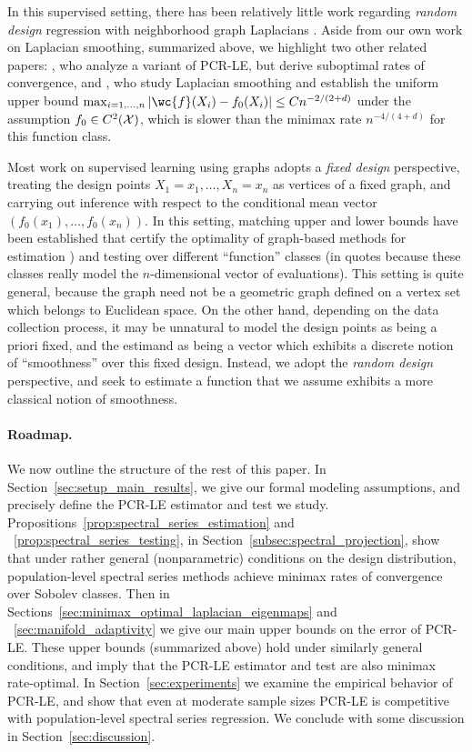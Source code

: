 In this supervised setting, there has been relatively little work regarding \emph{random design} regression with neighborhood graph Laplacians . Aside from our own work on Laplacian smoothing, summarized above, we highlight two other related papers: \citet{lee2016}, who analyze a variant of PCR-LE, but derive suboptimal rates of convergence, and \citet{trillos2020}, who study Laplacian smoothing and establish the uniform upper bound $\max_{i = 1,\ldots,n}|\wc{f}(X_i) - f_0(X_i)| \leq C n^{-2/(2 + d)}$ under the assumption $f_0 \in C^2(\mathcal{X})$, which is slower than the minimax rate $n^{-4/(4 + d)}$ for this function class. 

Most work on supervised learning using graphs adopts a \emph{fixed design} perspective, treating the design points $X_1 = x_1,\ldots,X_n = x_n$ as vertices of a fixed graph, and carrying out inference with respect to the conditional mean vector $(f_0(x_1),\ldots,f_0(x_n))$. In this setting, matching upper and lower bounds have been established that certify the optimality of graph-based methods for estimation \citep{wang2016,hutter2016,sadhanala16,sadhanala17,kirichenko2017,kirichenko2018}) and testing \citep{sharpnack2010identifying,sharpnack2013b,sharpnack2013,sharpnack2015} over different ``function'' classes (in quotes because these classes really model the $n$-dimensional vector of evaluations). This setting is quite general, because the graph need not be a geometric graph defined on a vertex set which belongs to Euclidean space. On the other hand, depending on the data collection process, it may be unnatural to model the design points as being a priori fixed, and the estimand as being a vector which exhibits a discrete notion of ``smoothness'' over this fixed design. Instead, we adopt the \emph{random design} perspective, and seek to estimate a function that we assume exhibits a more classical notion of smoothness. 

\paragraph{Roadmap.}
We now outline the structure of the rest of this paper. In Section~\ref{sec:setup_main_results}, we give our formal modeling assumptions, and precisely define the PCR-LE estimator and test we study. Propositions~\ref{prop:spectral_series_estimation} and ~\ref{prop:spectral_series_testing}, in Section~\ref{subsec:spectral_projection}, show that under rather general (nonparametric) conditions on the design distribution, population-level spectral series methods achieve minimax rates of convergence over Sobolev classes. Then in Sections~\ref{sec:minimax_optimal_laplacian_eigenmaps} and ~\ref{sec:manifold_adaptivity} we give our main upper bounds on the error of PCR-LE. These upper bounds (summarized above) hold under similarly general conditions, and imply that the PCR-LE estimator and test are also minimax rate-optimal. In Section~\ref{sec:experiments} we examine the empirical behavior of PCR-LE, and show that even at moderate sample sizes PCR-LE is competitive with population-level spectral series regression. We conclude with some discussion in Section~\ref{sec:discussion}. 

